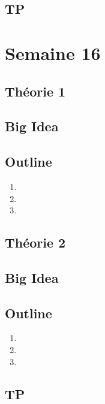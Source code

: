\documentclass{article}
\begin{document}
\subsection{TP}

\pagebreak
\section{Semaine 16}
\subsection{Théorie 1}
\subsection*{Big Idea}
\subsection*{Outline}
    \begin{enumerate}
    \item
    \item
    \item
    \end{enumerate}
\subsection{Théorie 2}
\subsection*{Big Idea}
\subsection*{Outline}
    \begin{enumerate}
    \item
    \item
    \item
    \end{enumerate}
\subsection{TP}

\pagebreak
\end{document}
